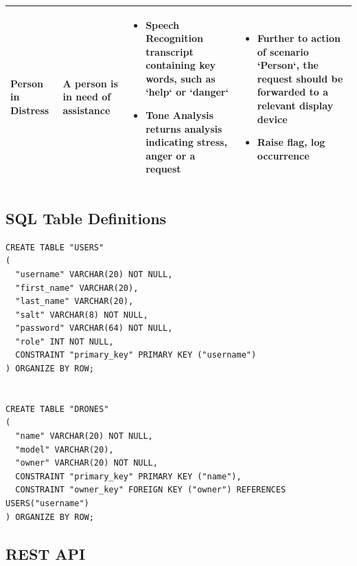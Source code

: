 \documentclass{article}
\begin{document}
\begin{table}[h]
\begin{tabularx}{\textwidth}{| >{\centering}m{1.5cm} | >{\centering}m{2cm} | X | X |}
    Person in Distress & \vspace{\baselineskip} A person is in need of assistance &
    \begin{itemize} [topsep=0pt, leftmargin=0cm,itemindent=.5cm,labelwidth=\itemindent,labelsep=0cm,align=left]
        \item Speech Recognition transcript containing key words, such as `help` or `danger`
        \item Tone Analysis returns analysis indicating stress, anger or a request
    \end{itemize} &
    \begin{itemize} [topsep=0pt, leftmargin=0cm,itemindent=.5cm,labelwidth=\itemindent,labelsep=0cm,align=left]
        \item Further to action of scenario `Person`, the request should be forwarded to a relevant display device
        \item Raise flag, log occurrence
    \end{itemize} \\ \hline


\end{tabularx}
\end{table}



\subsection{SQL Table Definitions} \label{SQLDefinitions}
\begin{center}
\begin{lstlisting} 
CREATE TABLE "USERS"
(
  "username" VARCHAR(20) NOT NULL,
  "first_name" VARCHAR(20),
  "last_name" VARCHAR(20),
  "salt" VARCHAR(8) NOT NULL,
  "password" VARCHAR(64) NOT NULL,
  "role" INT NOT NULL,
  CONSTRAINT "primary_key" PRIMARY KEY ("username")
) ORGANIZE BY ROW;


CREATE TABLE "DRONES"
(
  "name" VARCHAR(20) NOT NULL,
  "model" VARCHAR(20),
  "owner" VARCHAR(20) NOT NULL,
  CONSTRAINT "primary_key" PRIMARY KEY ("name"),
  CONSTRAINT "owner_key" FOREIGN KEY ("owner") REFERENCES USERS("username")
) ORGANIZE BY ROW;
\end{lstlisting}
\end{center}

\subsection{REST API} \label{apdxRestApi}
\end{document}
